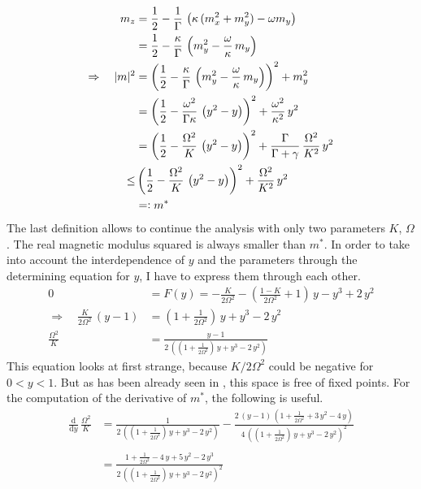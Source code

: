     \begin{align*}
        m_z&=\frac{1}{2}-\frac{1}{\Gamma}\,\left( \kappa\,(m_x^2+m_y^2)-\omega m_y  \right)\\
        &=\frac{1}{2}-\frac{\kappa}{\Gamma}\,\left( m_y^2-\frac{\omega}{\kappa}\, m_y  \right)\\
        \Rightarrow\quad |m|^2&=\left( \frac{1}{2}-\frac{\kappa}{\Gamma}\,\left( m_y^2-\frac{\omega}{\kappa}\, m_y  \right) \right)^2+m_y^2\\
        &=\left( \frac{1}{2}-\frac{\omega^2}{\Gamma\kappa}\,\left( {y}^2- {y} \right) \right)^2+\frac{\omega^2}{\kappa^2}\,{y}^2\\
        &=\left( \frac{1}{2}-\frac{\Omega^2}{K}\,\left( {y}^2- {y} \right) \right)^2+\frac{\Gamma}{\Gamma+\gamma}\,\frac{\Omega^2}{K^2}\,{y}^2\\
        \leq&\left( \frac{1}{2}-\frac{\Omega^2}{K}\,\left( {y}^2- {y} \right) \right)^2+\frac{\Omega^2}{K^2}\,{y}^2\\
        &=\vcentcolon m^*
    \end{align*}
    The last definition allows to continue the analysis with only two parameters $K$, $\Omega$. The real magnetic modulus squared is always smaller than $m^*$. In order to take into account the interdependence of $y$ and the parameters through the determining equation for $y$, I have to express them through each other. 
    \begin{align*}
        0&=F(y)=-\frac{K}{2\Omega^2}-\left( \frac{1-K}{2\Omega^2} +1\right)\,{y}-{y}^3+2\,{y}^2\\
        \Rightarrow\quad \frac{K}{2\Omega^2}\,({y}-1)&=(1+\frac{1}{2\Omega^2})\,{y}+{y}^3-2\,{y}^2\\
        \frac{\Omega^2}{K}&=\frac{{y}-1}{2\,\left(  (1+\frac{1}{2\Omega^2})\,{y}+{y}^3-2\,{y}^2\right)}
    \end{align*}
    This equation looks at first strange, because $K/2\Omega^2$ could be negative for $0<{y}<1$. But as has been already seen in , this space is free of fixed points. For the computation of the derivative of $m^*$, the following is useful. 
    \begin{align*}
        \frac{\text{d}}{\text{d}{y}}\,\frac{\Omega^2}{K}&=\frac{1}{2\,\left(  (1+\frac{1}{2\Omega^2})\,{y}+{y}^3-2\,{y}^2\right)}-\frac{2\,({y}-1)\,(1+\frac{1}{2\Omega^2}+3\,{y}^2-4\,{y})}{4\,\left(  (1+\frac{1}{2\Omega^2})\,{y}+{y}^3-2\,{y}^2\right)^2}\\\\
        &=\frac{1+\frac{1}{2\Omega^2}-4\,{y}+5\,{y}^2-2\,{y}^3}{2\,\left(  (1+\frac{1}{2\Omega^2})\,{y}+{y}^3-2\,{y}^2\right)^2}
    \end{align*}

